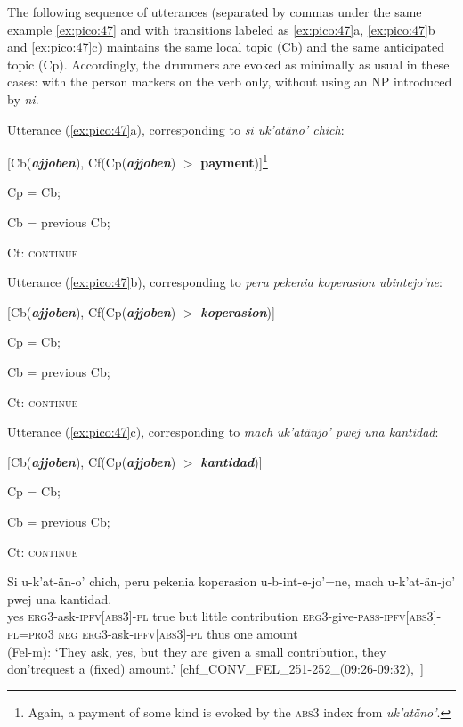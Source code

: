 \documentclass[output=paper
,modfonts
,nonflat]{langsci/langscibook}
\begin{document}
The following sequence of utterances (separated by commas under the same example \ref{ex:pico:47} and with transitions labeled as \ref{ex:pico:47}a, \ref{ex:pico:47}b and \ref{ex:pico:47}c) maintains the same local topic (Cb) and the same anticipated topic (Cp). Accordingly, the drummers are evoked as minimally as usual in these cases: with the person markers on the verb only, without using an NP introduced by \textit{ni}. 

\ea
\ea
Utterance (\ref{ex:pico:47}a), corresponding to \textit{si uk'atäno' chich}:

[Cb(\textbf{\textit{ajjoben}}),  Cf(Cp(\textbf{\textit{ajjoben}}) $>$ \textbf{payment})]\footnote{Again, a payment of some kind is evoked by the \textsc{abs3} index from \textit{uk'atäno'}.}

Cp = Cb;

Cb = previous Cb;

Ct: \textsc{continue}

\ex
Utterance (\ref{ex:pico:47}b), corresponding to \textit{peru pekenia koperasion ubintejo'ne}:

[Cb(\textbf{\textit{ajjoben}}),  Cf(Cp(\textbf{\textit{ajjoben}}) $>$ \textbf{\textit{koperasion}})]

Cp = Cb;

Cb = previous Cb;

Ct: \textsc{continue}

\ex
Utterance (\ref{ex:pico:47}c), corresponding to \textit{mach uk'atänjo' pwej una kantidad}:

[Cb(\textbf{\textit{ajjoben}}), Cf(Cp(\textbf{\textit{ajjoben}}) $>$ \textbf{\textit{kantidad}})]

Cp = Cb;

Cb = previous Cb;

Ct: \textsc{continue}
\z
\z

\ea{}
\label{ex:pico:47}

\gll Si u-k'at-än-o' chich, peru pekenia koperasion u-b-int-e-jo'=ne, mach u-k'at-\"an-jo' pwej una kantidad.
\\
yes \textsc{erg3}-ask-{\textsc{ipfv[abs3]}}-\textsc{pl} true but little contribution \textsc{erg3}-give-\textsc{pass}-{\textsc{ipfv[abs3]}}-\textsc{pl}=\textsc{pro3} {\textsc{neg}} \textsc{erg3}-ask-{\textsc{ipfv[abs3]}}-\textsc{pl} thus one amount\\
\glt (Fel-m): `They ask, yes, but they are given a small contribution, they don't\largerpage[2] request a (fixed) amount.' [chf\_CONV\_FEL\_251-252\_(09:26-09:32),~\citealt{Delgado-Galvan2018archive}]
\z
\end{document}
